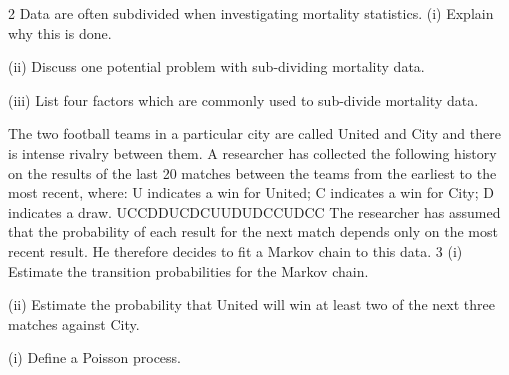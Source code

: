 \documentclass[a4paper,12pt]{article}
\begin{document}
\begin{enumerate}


2
Data are often subdivided when investigating mortality statistics.
(i) Explain why this is done.

(ii) Discuss one potential problem with sub-dividing mortality data.

(iii) List four factors which are commonly used to sub-divide mortality data.

The two football teams in a particular city are called United and City and there is
intense rivalry between them. A researcher has collected the following history on the
results of the last 20 matches between the teams from the earliest to the most recent,
where:
U indicates a win for United;
C indicates a win for City;
D indicates a draw.
UCCDDUCDCUUDUDCCUDCC
The researcher has assumed that the probability of each result for the next match
depends only on the most recent result. He therefore decides to fit a Markov chain to
this data.
3
(i) Estimate the transition probabilities for the Markov chain.

(ii) Estimate the probability that United will win at least two of the next three
matches against City.

(i) Define a Poisson process.



\end{enumerate}
\end{document}
